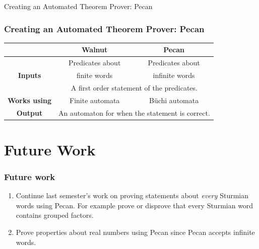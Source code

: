 \documentclass[leqno,presentation]{beamer}
\begin{document}
\begin{frame}{Creating an Automated Theorem Prover: Pecan}
    \frametitle{Creating an Automated Theorem Prover: Pecan}
    
\begin{table}[]
\begin{tabular}{|c|c|c|}
\hline
& \textbf{Walnut}  & \textbf{Pecan} \\ \hline
\multirow{3}{*}{\textbf{Inputs}}       & Predicates about & Predicates about \\

  & finite words    & infinite words \\\cline{2-3}
  & \multicolumn{2}{c|}{A first order statement of the predicates.} \\\hline

\textbf{Works using}                   & Finite automata  & B\"uchi automata   \\\hline
\textbf{Output} & \multicolumn{2}{c|}{An automaton for when the statement is correct. }\\\hline
\end{tabular}
\end{table}
    
\end{frame}

\section{Future Work}
\begin{frame}
  \frametitle{Future work}
  \begin{enumerate}
  \item Continue last semester's work on proving statements about \emph{every} Sturmian words using Pecan. For example prove or disprove that every Sturmian word contains grouped factors. 
  
  \item Prove properties about real numbers using Pecan since Pecan accepts infinite words.

  \end{enumerate}
  
\end{frame}
\end{document}
